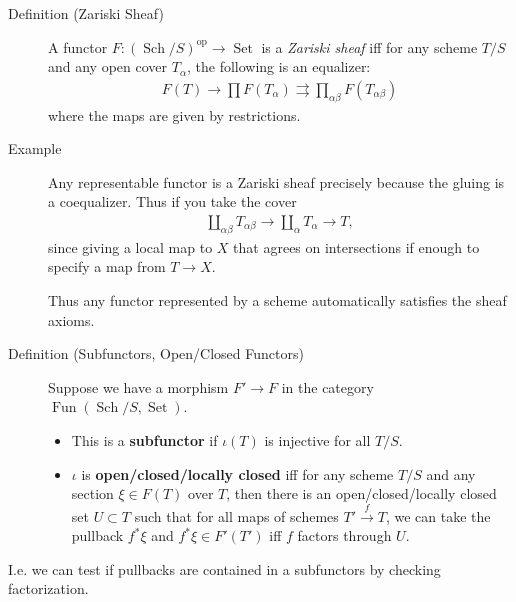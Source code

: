 \begin{description}
\item[Definition (Zariski Sheaf)]
A functor
\(F: ({\operatorname{Sch}}/S)^\operatorname{op}\to {\operatorname{Set}}\)
is a \emph{Zariski sheaf} iff for any scheme \(T/S\) and any open cover
\(T_\alpha\), the following is an equalizer:
\begin{align*}
F(T) \to \prod F(T_\alpha) \rightrightarrows \prod_{\alpha\beta} F(T_{\alpha\beta})
\end{align*}
where the maps are given by restrictions.
\item[Example]
Any representable functor is a Zariski sheaf precisely because the
gluing is a coequalizer. Thus if you take the cover
\begin{align*}
{\coprod}_{\alpha\beta} T_{\alpha\beta} \to {\coprod}_{\alpha}T_\alpha \to T
,\end{align*}
since giving a local map to \(X\) that agrees on intersections if enough
to specify a map from \(T\to X\).

Thus any functor represented by a scheme automatically satisfies the
sheaf axioms.
\item[Definition (Subfunctors, Open/Closed Functors)]
Suppose we have a morphism \(F' \to F\) in the category
\({\operatorname{Fun}}({\operatorname{Sch}}/S, {\operatorname{Set}})\).

\begin{itemize}
\item
  This is a \textbf{subfunctor} if \(\iota(T)\) is injective for all
  \(T/S\).
\item
  \(\iota\) is \textbf{open/closed/locally closed} iff for any scheme
  \(T/S\) and any section \(\xi \in F(T)\) over \(T\), then there is an
  open/closed/locally closed set \(U\subset T\) such that for all maps
  of schemes \(T' \xrightarrow{f} T\), we can take the pullback
  \(f^* \xi\) and \(f^*\xi \in F'(T')\) iff \(f\) factors through \(U\).
\end{itemize}
\end{description}

I.e. we can test if pullbacks are contained in a subfunctors by checking
factorization.

